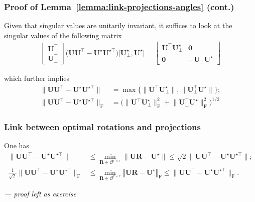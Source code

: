 \documentclass[compress,
mathserif,wide,%
]{beamer}
\begin{document}
\begin{frame}
\frametitle{Proof of Lemma~\ref{lemma:link-projections-angles} (cont.)}
Given that singular values are unitarily invariant, it suffices to look at
the singular values of the following matrix
%
\begin{align*}
\left[\begin{array}{c}
\bm{U}^{\top}\\
\bm{U}_{\perp}^{\top}
\end{array}\right]\big(\bm{U}\bm{U}^{\top}- {\bm{U}}^{\star} {\bm{U}}^{\star\top}\big)
	\big[
{\bm{U}}_{\perp}^{\star} , {\bm{U}}^{\star} \big]=\left[\begin{array}{cc}
	\bm{U}^{\top}{\bm{U}}_{\perp}^{\star} & \bm{0}\\
\bm{0} & -\bm{U}_{\perp}^{\top} {\bm{U}}^{\star}
\end{array}\right]
\end{align*}

which further implies
\begin{subequations}
\begin{align*}
	\big\|\bm{U}\bm{U}^{\top}-\bm{U}^{\star}\bm{U}^{\star\top}\big\| &= \max\big\{\big\|\bm{U}^{\top}\bm{U}_{\perp}^{\star}\big\|,\big\|\bm{U}_{\perp}^{\top}\bm{U}^{\star}\big\|\big\}; \\
	\big\|\bm{U}\bm{U}^{\top}-\bm{U}^{\star}\bm{U}^{\star\top}\big\|_{\mathrm{F}} & =\Big(\big\|\bm{U}^{\top}\bm{U}_{\perp}^{\star}\big\|_{\mathrm{F}}^{2}+\big\|\bm{U}_{\perp}^{\top}\bm{U}^{\star}\big\|_{\mathrm{F}}^{2}\Big)^{1/2}
\end{align*}
\end{subequations}

\end{frame}




\begin{frame}
	\frametitle{Link between optimal rotations and projections}
	\begin{lemma}\label{prop:rotation-UR}
	One has
\begin{align*}
	\|\bm{U}\bm{U}^{\top} - \bm{U}^{\star}\bm{U}^{\star\top} \|
	&\leq
	\min_{\bm{R}\in \mathcal{O}^{r\times r}}\big\|\bm{U}\bm{R}-\bm{U}^{\star}\big\|
	\leq \sqrt{2} \|\bm{U}\bm{U}^{\top} - \bm{U}^{\star}\bm{U}^{\star\top} \|; \\
	\tfrac{1}{\sqrt{2}} \|\bm{U}\bm{U}^{\top} - \bm{U}^{\star}\bm{U}^{\star\top} \|_{\mathrm{F}}
	&\leq
	\min_{\bm{R}\in\mathcal{O}^{r\times r}}\left\Vert \bm{U}\bm{R}-\bm{U}^{\star}\right\Vert _{\mathrm{F}}
	\leq \|\bm{U}\bm{U}^{\top} - \bm{U}^{\star}\bm{U}^{\star\top} \|_{\mathrm{F}}.
\end{align*}
\end{lemma}

{\hfill \footnotesize \em --- proof left as exercise}
\end{frame}
\end{document}
